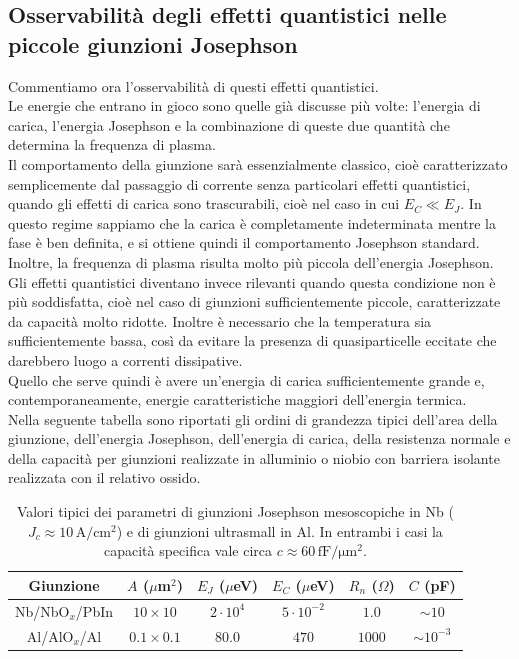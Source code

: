 \subsection{Osservabilità degli effetti quantistici nelle piccole giunzioni Josephson}
Commentiamo ora l'osservabilità di questi effetti quantistici.\\
Le energie che entrano in gioco sono quelle già discusse più volte: l'energia di carica, l'energia Josephson e la combinazione di queste due quantità che determina la frequenza di plasma.\\
Il comportamento della giunzione sarà essenzialmente classico, cioè caratterizzato semplicemente dal passaggio di corrente senza particolari effetti quantistici, quando gli effetti di carica sono trascurabili, cioè nel caso in cui $E_C \ll E_J$. In questo regime sappiamo che la carica è completamente indeterminata mentre la fase è ben definita, e si ottiene quindi il comportamento Josephson standard. Inoltre, la frequenza di plasma risulta molto più piccola dell'energia Josephson.\\
Gli effetti quantistici diventano invece rilevanti quando questa condizione non è più soddisfatta, cioè nel caso di giunzioni sufficientemente piccole, caratterizzate da capacità molto ridotte. Inoltre è necessario che la temperatura sia sufficientemente bassa, così da evitare la presenza di quasiparticelle eccitate che darebbero luogo a correnti dissipative.\\
Quello che serve quindi è avere un'energia di carica sufficientemente grande e, contemporaneamente, energie caratteristiche maggiori dell'energia termica.\\
Nella seguente tabella sono riportati gli ordini di grandezza tipici dell'area della giunzione, dell'energia Josephson, dell'energia di carica, della resistenza normale e della capacità per giunzioni realizzate in alluminio o niobio con barriera isolante realizzata con il relativo ossido.
\begin{table}[H]
    \centering
    \footnotesize
    \renewcommand{\arraystretch}{1.3}
    \begin{tabular}{|c|c|c|c|c|c|}
        \hline
        Giunzione & $A$ ($\mu$m$^2$) & $E_J$ ($\mu$eV) & $E_C$ ($\mu$eV) & $R_n$ ($\Omega$) & $C$ (pF) \\
        \hline
        Nb/NbO$_x$/PbIn & $10 \times 10$ & $2 \cdot 10^{4}$ & $5 \cdot 10^{-2}$ & $1.0$ & $\sim 10$ \\
        \hline
        Al/AlO$_x$/Al & $0.1 \times 0.1$ & $80.0$ & $470$ & $1000$ & $\sim 10^{-3}$ \\
        \hline
    \end{tabular}
    \caption*{
    Valori tipici dei parametri di giunzioni Josephson mesoscopiche in Nb ($J_c \approx 10\,\mathrm{A/cm^2}$) e di giunzioni ultrasmall in Al. In entrambi i casi la capacità specifica vale circa $c \approx 60\,\mathrm{fF/\mu m^2}$.}
\end{table}
